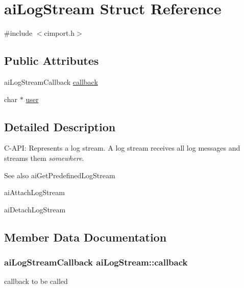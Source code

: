 \hypertarget{structai_log_stream}{}\section{ai\+Log\+Stream Struct Reference}
\label{structai_log_stream}


{\ttfamily \#include $<$cimport.\+h$>$}

\subsection*{Public Attributes}
\begin{DoxyCompactItemize}
\item 
ai\+Log\+Stream\+Callback \hyperlink{structai_log_stream_ac73ae46eee54ba0f920d6abb97c33e97}{callback}
\item 
char $\ast$ \hyperlink{structai_log_stream_a3382042e4171a6dd5a71d7f98741f86e}{user}
\end{DoxyCompactItemize}


\subsection{Detailed Description}
C-\/\+A\+PI\+: Represents a log stream. A log stream receives all log messages and streams them {\itshape somewhere}. \begin{DoxySeeAlso}{See also}
ai\+Get\+Predefined\+Log\+Stream 

ai\+Attach\+Log\+Stream 

ai\+Detach\+Log\+Stream 
\end{DoxySeeAlso}


\subsection{Member Data Documentation}
\subsubsection[{\texorpdfstring{callback}{callback}}]{\setlength{\rightskip}{0pt plus 5cm}ai\+Log\+Stream\+Callback ai\+Log\+Stream\+::callback}\hypertarget{structai_log_stream_ac73ae46eee54ba0f920d6abb97c33e97}{}\label{structai_log_stream_ac73ae46eee54ba0f920d6abb97c33e97}
callback to be called 
